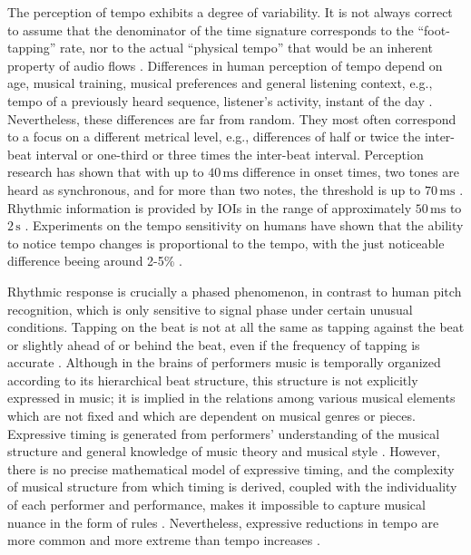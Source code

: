 \documentclass{scrartcl}
\begin{document}
The perception of tempo exhibits a degree of variability. It is not always correct to assume that the denominator of the time signature corresponds to the ``foot-tapping'' rate, nor to the actual ``physical tempo'' that would be an inherent property of audio flows \cite{Drake1999}. Differences in human perception of tempo depend on age, musical training, musical preferences and general listening context, e.g., tempo of a previously heard sequence, listener's activity, instant of the day \cite{Drake2000,Drake1993,Drake2000b}. Nevertheless, these differences are  far from random. They most often correspond to a focus on a different metrical level, e.g., differences of half or twice the inter-beat interval or one-third or three times the inter-beat interval. Perception research has shown that with up to $40\,\text{ms}$ difference in onset times, two tones are heard as synchronous, and for more than two notes, the threshold is up to $70\,\text{ms}$ \cite{Handel1989}. Rhythmic information is provided by IOIs in the range of approximately $50\,\text{ms}$ to $2\,\text{s}$ \cite{Handel1989}. Experiments on the tempo sensitivity on humans have shown that the ability to notice tempo changes is proportional to the tempo, with the just noticeable difference beeing around 2-5\% \cite{Drake1993}.

Rhythmic response is crucially a phased phenomenon, in contrast to human pitch recognition, which is only sensitive to signal phase under certain unusual conditions. Tapping on the beat is not at all the same as tapping against the beat or slightly ahead of or behind the beat, even if the frequency of tapping is accurate \cite{Scheirer1998}. Although in the brains of performers music is temporally organized according to its hierarchical beat structure, this structure is not explicitly expressed in music; it is implied in the relations among various musical elements which are not fixed and which are dependent on musical genres or pieces. Expressive timing is generated from performers' understanding of the musical structure and general knowledge of music theory and musical style \cite{Clarke1999}. However, there is no precise mathematical model of expressive timing, and the complexity of musical structure from which timing is derived, coupled with the individuality of each performer and performance, makes it impossible to capture musical nuance in the form of rules \cite{Dixon2001}. Nevertheless, expressive reductions in tempo are more common and more extreme than tempo increases \cite{Repp1994}. 
\end{document}
